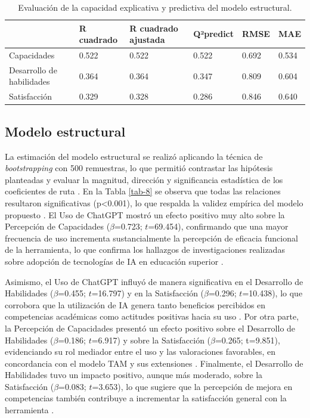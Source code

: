 \documentclass[spanish]{textolivre}
\begin{document}
\begin{table}[h!]
\centering
\begin{threeparttable}
\caption{Evaluación de la capacidad explicativa y predictiva del modelo estructural.}\label{tab-7}
\begin{tabular}{l l l l l l}
\toprule
 & R cuadrado & R cuadrado ajustada & Q²predict & RMSE & MAE \\
\midrule
Capacidades & 0.522 & 0.522 & 0.522 & 0.692 & 0.534 \\
Desarrollo de habilidades & 0.364 & 0.364 & 0.347 & 0.809 & 0.604 \\
Satisfacción & 0.329 & 0.328 & 0.286 & 0.846 & 0.640 \\
\bottomrule
\end{tabular}
\end{threeparttable}
\end{table}

\subsection{Modelo estructural}
La estimación del modelo estructural se realizó aplicando la técnica de \textit{bootstrapping} con 500 remuestras, lo que permitió contrastar las hipótesis planteadas y evaluar la magnitud, dirección y significancia estadística de los coeficientes de ruta \cite{hair2019}. En la Tabla \ref{tab-8} se observa que todas las relaciones resultaron significativas (p<0.001), lo que respalda la validez empírica del modelo propuesto \cite{zeng2021}. El Uso de ChatGPT mostró un efecto positivo muy alto sobre la Percepción de Capacidades ($\beta$=0.723; $t$=69.454), confirmando que una mayor frecuencia de uso incrementa sustancialmente la percepción de eficacia funcional de la herramienta, lo que confirma los hallazgos de investigaciones realizadas sobre adopción de tecnologías de IA en educación superior \cite{hamid2023}.

Asimismo, el Uso de ChatGPT influyó de manera significativa en el Desarrollo de Habilidades ($\beta$=0.455; $t$=16.797) y en la Satisfacción ($\beta$=0.296; $t$=10.438), lo que corrobora que la utilización de IA genera tanto beneficios percibidos en competencias académicas como actitudes positivas hacia su uso \cite{wang2023}. Por otra parte, la Percepción de Capacidades presentó un efecto positivo sobre el Desarrollo de Habilidades ($\beta$=0.186; $t$=6.917) y sobre la Satisfacción ($\beta$=0.265; t=9.851), evidenciando su rol mediador entre el uso y las valoraciones favorables, en concordancia con el modelo TAM y sus extensiones \cite{yudhistyra2025}. Finalmente, el Desarrollo de Habilidades tuvo un impacto positivo, aunque más moderado, sobre la Satisfacción ($\beta$=0.083; $t$=3.653), lo que sugiere que la percepción de mejora en competencias también contribuye a incrementar la satisfacción general con la herramienta \cite{alshammari2025}.
\end{document}
